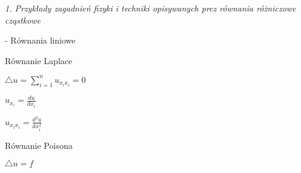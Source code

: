 \textit{1. Przykłady zagadnień fizyki i techniki opisywanych prez równania różniczowe cząstkowe}


- Równania liniowe

Równanie Laplace

$ \bigtriangleup u = \sum_{i=1}^{n} u_{x_ix_i} =0$

$ u_{x_i} = \frac{du}{dx_i}$

$ u_{x_i x_i} = \frac{d^2u}{dx_i^2}$

Równanie Poisona

$ \bigtriangleup u =f$